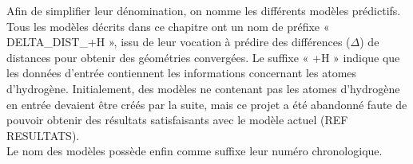 Afin de simplifier leur dénomination, on nomme les différents modèles prédictifs. Tous les modèles décrits dans ce chapitre ont un nom de préfixe « DELTA\_DIST\_+H », issu de leur vocation à prédire des différences ($\Delta$) de distances pour obtenir des géométries convergées. Le suffixe « +H » indique que les données d'entrée contiennent les informations concernant les atomes d'hydrogène. Initialement, des modèles ne contenant pas les atomes d'hydrogène en entrée devaient être créés par la suite, mais ce projet a été abandonné faute de pouvoir obtenir des résultats satisfaisants avec le modèle actuel (REF RESULTATS).\\
Le nom des modèles possède enfin comme suffixe leur numéro chronologique.